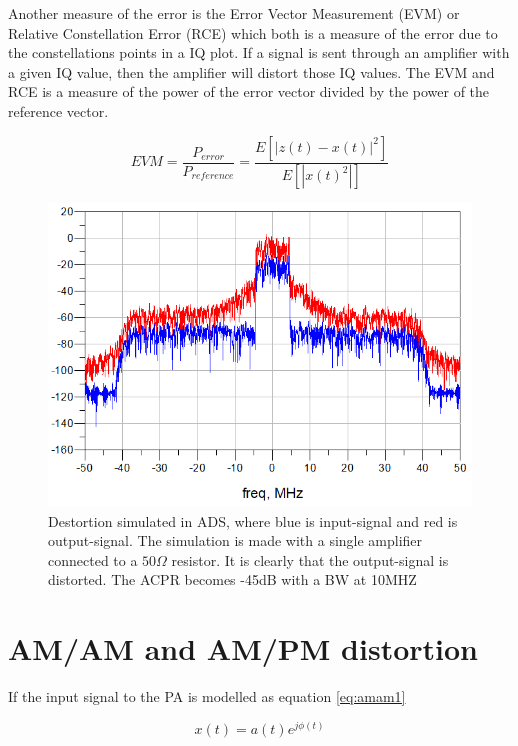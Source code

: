 Another measure of the error is the Error Vector Measurement (EVM) or  Relative Constellation Error (RCE) which both is a measure of the error due to the constellations points in a IQ plot. If a signal is sent through an amplifier with a given IQ value, then the amplifier will distort those IQ values. The EVM and RCE is a measure of the power of the error vector divided by the power of the reference vector. \citep{ali2016}

\begin{equation} \label{eq:evm}
	EVM = \frac{P_{error}}{P_{reference}} = \frac{E[|z(t)-x(t)|^2]}{E[|x(t)^2|]}
\end{equation}  
 
\begin{figure}[H]
\centering 
\includegraphics[scale = 0.5]{figures/ch1/ads_nonlin_dest.png}
\caption{Destortion simulated in ADS, where blue is input-signal and red is output-signal. The simulation is made with a single amplifier connected to a $50\Omega$ resistor. It is clearly that the output-signal is distorted. The ACPR becomes -45dB with a BW at 10MHZ}
\label{fig:pre_cons}
\end{figure}


\section{AM/AM and AM/PM distortion}
If the input signal to the PA is modelled as equation \ref{eq:amam1}

\begin{equation}\label{eq:amam1}
x(t) = a(t)e^{j\phi(t)}
\end{equation}

